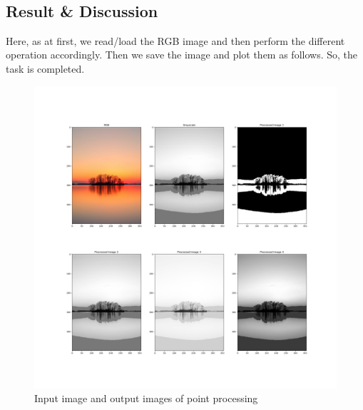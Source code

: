 \documentclass{article}
\begin{document}
{\begin{lstlisting}[language=Python, caption=Code for point processing and thresholding]
    \end{lstlisting}
    \\
    \subsection{Result & Discussion}{
        Here, as at first, we read/load the RGB image and then perform the different operation accordingly. Then we save the image and plot them as follows. So, the task is completed.
        
        \begin{figure}[htp]
            \centering
            \includegraphics[width=1.0\textwidth]{Assignment-2/fig-1.jpg}
            \caption{Input image and output images of point processing}
        \end{figure}
    }
}
\clearpage
\end{document}
